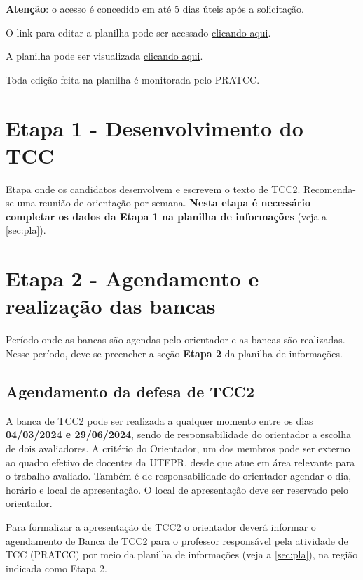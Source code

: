 \documentclass[a4paper, 12pt]{article}
\newcommand{\startdate}{04/03/2024}		%
\newcommand{\bancadate}{29/06/2024}		%
\begin{document}
	\textbf{Atenção}: o acesso é concedido em até 5 dias úteis após a solicitação.
	
	O link para editar a planilha pode ser acessado \href{https://docs.google.com/spreadsheets/d/1kvA48JsgkLEdtAHvRgQ_IDVJ_20ch6-fIN_75WXXCfA/edit?usp=sharing}{clicando aqui}.
	
	A planilha pode ser visualizada \href{https://docs.google.com/spreadsheets/d/e/2PACX-1vRBVzCBFvFwd0x0fgkgbf2qIa7ubVvVlpGffdX8YjB73VHXoW492Vf9BC0-FdDoz8Xm2ngQCqe_pHM-/pubhtml}{clicando aqui}.

	Toda edição feita na planilha é monitorada pelo PRATCC.

	\section{Etapa 1 - Desenvolvimento do TCC}
	\label{sec:et1}
	Etapa onde os candidatos desenvolvem e escrevem o texto de TCC2. Recomenda-se uma reunião de orientação por semana. \textbf{Nesta etapa é necessário completar os dados da Etapa 1 na planilha de informações} (veja a \autoref{sec:pla}).

    \section{Etapa 2 - Agendamento e realização das bancas}
	\label{sec:et2}

	Período onde as bancas são agendas pelo orientador e as bancas são realizadas. Nesse período, deve-se preencher a seção \textbf{Etapa 2} da planilha de informações.
   	
	\subsection{Agendamento da defesa de TCC2}

    A banca de TCC2 pode ser realizada a qualquer momento entre os dias \textbf{\startdate{} e \bancadate{}}, sendo de responsabilidade do orientador a escolha de dois avaliadores. A critério do Orientador, um dos membros pode ser externo ao quadro efetivo de docentes da UTFPR, desde que atue em área relevante para o trabalho avaliado. Também é de responsabilidade do orientador agendar o dia, horário e local de apresentação. O local de apresentação deve ser reservado pelo orientador.
    
    Para formalizar a apresentação de TCC2 o orientador deverá informar o agendamento de Banca de TCC2 para o professor responsável pela atividade de TCC (PRATCC) por meio da planilha de informações (veja a \autoref{sec:pla}), na região indicada como Etapa 2.
    
\end{document}

